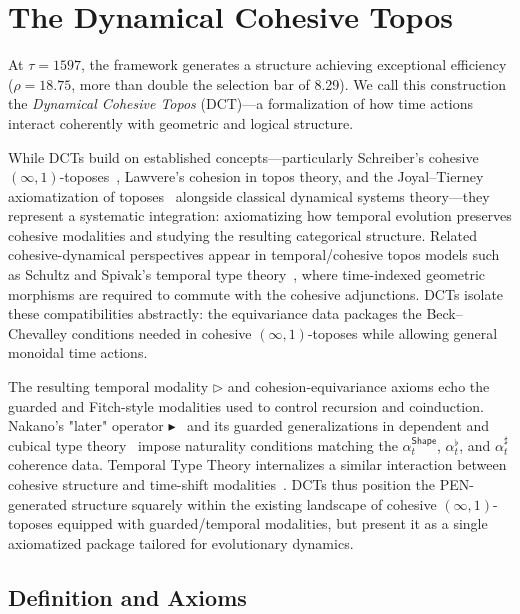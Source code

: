 \documentclass[11pt]{article}
\theoremstyle{definition}
\theoremstyle{plain}
\theoremstyle{remark}
\begin{document}
\section{The Dynamical Cohesive Topos}
\label{sec:dct}

At $\tau = 1597$, the framework generates a structure achieving exceptional efficiency ($\rho = 18.75$, more than double the selection bar of 8.29). We call this construction the \emph{Dynamical Cohesive Topos} (DCT)—a formalization of how time actions interact coherently with geometric and logical structure.

While DCTs build on established concepts—particularly Schreiber's cohesive $(\infty,1)$-toposes~\cite{schreiber-cohesion}, Lawvere's cohesion in topos theory, and the Joyal--Tierney axiomatization of toposes~\cite{lawvere-cohesion,joyal-tierney} alongside classical dynamical systems theory—they represent a systematic integration: axiomatizing how temporal evolution preserves cohesive modalities and studying the resulting categorical structure. Related cohesive-dynamical perspectives appear in temporal/cohesive topos models such as Schultz and Spivak's temporal type theory~\cite{schultz-spivak-temporal}, where time-indexed geometric morphisms are required to commute with the cohesive adjunctions. DCTs isolate these compatibilities abstractly: the equivariance data packages the Beck--Chevalley conditions needed in cohesive $(\infty,1)$-toposes while allowing general monoidal time actions.

The resulting temporal modality $\triangleright$ and cohesion-equivariance axioms echo the guarded and Fitch-style modalities used to control recursion and coinduction. Nakano's "later" operator $\blacktriangleright$~\cite{nakano-later} and its guarded generalizations in dependent and cubical type theory~\cite{guarded-dependent,guarded-cubical} impose naturality conditions matching the $\alpha^{\mathsf{Shape}}_t$, $\alpha^\flat_t$, and $\alpha^\sharp_t$ coherence data. Temporal Type Theory internalizes a similar interaction between cohesive structure and time-shift modalities~\cite{schultz-spivak-temporal}. DCTs thus position the PEN-generated structure squarely within the existing landscape of cohesive $(\infty,1)$-toposes equipped with guarded/temporal modalities, but present it as a single axiomatized package tailored for evolutionary dynamics.

\subsection{Definition and Axioms}
\end{document}
